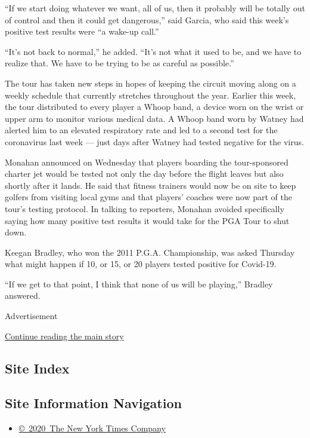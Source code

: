 ``If we start doing whatever we want, all of us, then it probably will
be totally out of control and then it could get dangerous,'' said
Garcia, who said this week's positive test results were ``a wake-up
call.''

``It's not back to normal,'' he added. ``It's not what it used to be,
and we have to realize that. We have to be trying to be as careful as
possible.''

The tour has taken new steps in hopes of keeping the circuit moving
along on a weekly schedule that currently stretches throughout the year.
Earlier this week, the tour distributed to every player a Whoop band, a
device worn on the wrist or upper arm to monitor various medical data. A
Whoop band worn by Watney had alerted him to an elevated respiratory
rate and led to a second test for the coronavirus last week --- just
days after Watney had tested negative for the virus.

Monahan announced on Wednesday that players boarding the tour-sponsored
charter jet would be tested not only the day before the flight leaves
but also shortly after it lands. He said that fitness trainers would now
be on site to keep golfers from visiting local gyms and that players'
coaches were now part of the tour's testing protocol. In talking to
reporters, Monahan avoided specifically saying how many positive test
results it would take for the PGA Tour to shut down.

Keegan Bradley, who won the 2011 P.G.A. Championship, was asked Thursday
what might happen if 10, or 15, or 20 players tested positive for
Covid-19.

``If we get to that point, I think that none of us will be playing,''
Bradley answered.

Advertisement

\protect\hyperlink{after-bottom}{Continue reading the main story}

\hypertarget{site-index}{%
\subsection{Site Index}\label{site-index}}

\hypertarget{site-information-navigation}{%
\subsection{Site Information
Navigation}\label{site-information-navigation}}

\begin{itemize}
\tightlist
\item
  \href{https://help.nytimes.com/hc/en-us/articles/115014792127-Copyright-notice}{©~2020~The
  New York Times Company}
\end{itemize}

